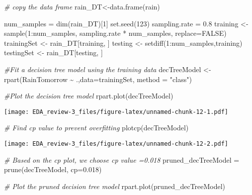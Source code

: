 \documentclass[
]{article}
\newenvironment{Shaded}{\begin{snugshade}}{\end{snugshade}}
\newcommand{\AttributeTok}[1]{\textcolor[rgb]{0.77,0.63,0.00}{#1}}
\newcommand{\CommentTok}[1]{\textcolor[rgb]{0.56,0.35,0.01}{\textit{#1}}}
\newcommand{\ConstantTok}[1]{\textcolor[rgb]{0.00,0.00,0.00}{#1}}
\newcommand{\DecValTok}[1]{\textcolor[rgb]{0.00,0.00,0.81}{#1}}
\newcommand{\FloatTok}[1]{\textcolor[rgb]{0.00,0.00,0.81}{#1}}
\newcommand{\FunctionTok}[1]{\textcolor[rgb]{0.00,0.00,0.00}{#1}}
\newcommand{\NormalTok}[1]{#1}
\newcommand{\OtherTok}[1]{\textcolor[rgb]{0.56,0.35,0.01}{#1}}
\newcommand{\SpecialCharTok}[1]{\textcolor[rgb]{0.00,0.00,0.00}{#1}}
\newcommand{\StringTok}[1]{\textcolor[rgb]{0.31,0.60,0.02}{#1}}
\begin{document}
\begin{Shaded}
\begin{Highlighting}[]
\CommentTok{\# copy the data frame}
\NormalTok{rain\_DT}\OtherTok{\textless{}{-}}\FunctionTok{data.frame}\NormalTok{(rain)}

\NormalTok{num\_samples }\OtherTok{=} \FunctionTok{dim}\NormalTok{(rain\_DT)[}\DecValTok{1}\NormalTok{]}
\FunctionTok{set.seed}\NormalTok{(}\DecValTok{123}\NormalTok{)}
\NormalTok{sampling.rate }\OtherTok{=} \FloatTok{0.8}
\NormalTok{training }\OtherTok{\textless{}{-}} \FunctionTok{sample}\NormalTok{(}\DecValTok{1}\SpecialCharTok{:}\NormalTok{num\_samples, sampling.rate }\SpecialCharTok{*}\NormalTok{ num\_samples, }\AttributeTok{replace=}\ConstantTok{FALSE}\NormalTok{)}
\NormalTok{trainingSet }\OtherTok{\textless{}{-}}\NormalTok{ rain\_DT[training, ]}
\NormalTok{testing }\OtherTok{\textless{}{-}} \FunctionTok{setdiff}\NormalTok{(}\DecValTok{1}\SpecialCharTok{:}\NormalTok{num\_samples,training)}
\NormalTok{testingSet }\OtherTok{\textless{}{-}}\NormalTok{ rain\_DT[testing, ]}

\CommentTok{\#Fit a decision tree model using the training data}
\NormalTok{decTreeModel }\OtherTok{\textless{}{-}} \FunctionTok{rpart}\NormalTok{(RainTomorrow }\SpecialCharTok{\textasciitilde{}}\NormalTok{ .,}\AttributeTok{data=}\NormalTok{trainingSet, }\AttributeTok{method =} \StringTok{"class"}\NormalTok{)}

\CommentTok{\#Plot the decision tree model}
\FunctionTok{rpart.plot}\NormalTok{(decTreeModel)}
\end{Highlighting}
\end{Shaded}

\texttt{[image: EDA\_review-3\_files/figure-latex/unnamed-chunk-12-1.pdf]}

\begin{Shaded}
\begin{Highlighting}[]
\CommentTok{\# Find cp value to prevent overfitting}
\FunctionTok{plotcp}\NormalTok{(decTreeModel)}
\end{Highlighting}
\end{Shaded}

\texttt{[image: EDA\_review-3\_files/figure-latex/unnamed-chunk-12-2.pdf]}

\begin{Shaded}
\begin{Highlighting}[]
\CommentTok{\# Based on the cp plot, we choose cp value =0.018}
\NormalTok{pruned\_decTreeModel }\OtherTok{=} \FunctionTok{prune}\NormalTok{(decTreeModel, }\AttributeTok{cp=}\FloatTok{0.018}\NormalTok{)}

\CommentTok{\# Plot the pruned decision tree model}
\FunctionTok{rpart.plot}\NormalTok{(pruned\_decTreeModel)}
\end{Highlighting}
\end{Shaded}
\end{document}
